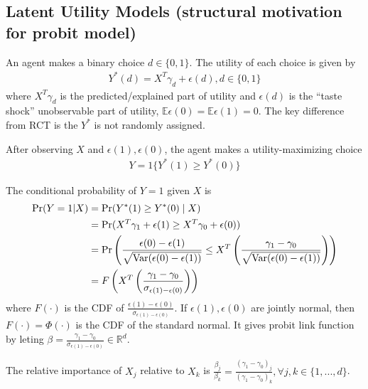 \documentclass[11pt]{elegantbook}
\begin{document}
\subsection{Latent Utility Models (structural motivation for probit model)}
An agent makes a binary choice $d \in \{0, 1\}$. The utility of each choice is given by
\begin{equation}
    \begin{aligned}
        Y^*(d)=X^T\gamma_d+\epsilon(d),d\in\{0,1\}
    \end{aligned}
    \nonumber
\end{equation}
where $X^T\gamma_d$ is the predicted/explained part of utility and $\epsilon(d)$ is the ``taste shock'' unobservable part of utility, $\mathbb{E}\epsilon(0)=\mathbb{E}\epsilon(1)=0$. The key difference from RCT is the $Y^*$ is not randomly assigned.

After observing $X$ and $\epsilon(1), \epsilon(0)$, the agent makes a utility-maximizing choice
\begin{equation}
    \begin{aligned}
        Y=1\{Y^*(1)\geq Y^*(0)\}
    \end{aligned}
    \nonumber
\end{equation}

The conditional probability of $Y = 1$ given $X$ is
\begin{equation}
    \begin{aligned}
        \textnormal{Pr}(Y=1|X)&=\textnormal{Pr}(Y^*(1)\geq Y^*(0)\mid X)\\
        &=\textnormal{Pr}(X^T\gamma_1+\epsilon(1)\geq X^T\gamma_0+\epsilon(0))\\
        &=\textnormal{Pr}\left(\frac{\epsilon(0)-\epsilon(1)}{\sqrt{\textnormal{Var}(\epsilon(0)-\epsilon(1))}}\leq X^T\left(\frac{\gamma_1-\gamma_0}{\sqrt{\textnormal{Var}(\epsilon(0)-\epsilon(1))}}\right)\right)\\
        &=F\left(X^T\left(\frac{\gamma_1-\gamma_0}{\sigma_{\epsilon(1)-\epsilon(0)}}\right)\right)
    \end{aligned}
    \nonumber
\end{equation}
where $F(\cdot)$ is the CDF of $\frac{\epsilon(1)-\epsilon(0)}{\sigma_{\epsilon(1)-\epsilon(0)}}$. If $\epsilon(1),\epsilon(0)$ are jointly normal, then $F(\cdot)=\Phi(\cdot)$ is the CDF of the standard normal. It gives probit link function by leting $\beta=\frac{\gamma_1-\gamma_0}{\sigma_{\epsilon(1)-\epsilon(0)}}\in \mathbb{R}^d$.

The relative importance of $X_j$ relative to $X_k$ is $\frac{\beta_j}{\beta_k}=\frac{(\gamma_1-\gamma_0)_j}{(\gamma_1-\gamma_0)_k},\forall j,k\in \{1,...,d\}$.
\end{document}
